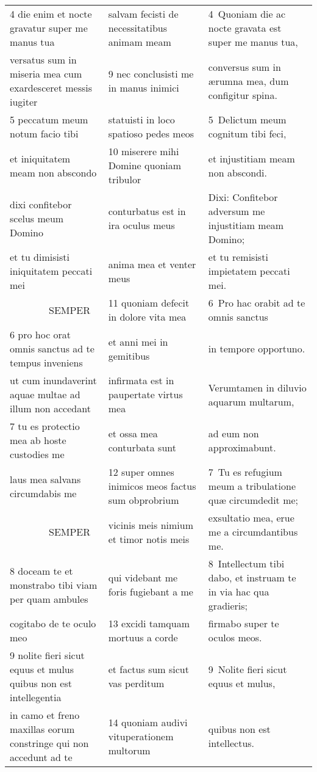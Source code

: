 \documentclass{article}
\begin{document}
\begin{longtable}{@{}p{}p{}p{}@{}}
4 die enim et nocte gravatur super me manus tua	&	salvam fecisti de necessitatibus animam meam	&	4 Quoniam die ac nocte gravata est super me manus tua,	\\
versatus sum in miseria mea cum exardesceret messis iugiter	&	9 nec conclusisti me in manus inimici	&	conversus sum in ærumna mea, dum configitur spina.	\\
5 peccatum meum notum facio tibi	&	statuisti in loco spatioso pedes meos	&	5 Delictum meum cognitum tibi feci,	\\
et iniquitatem meam non abscondo	&	10 miserere mihi Domine quoniam tribulor	&	et injustitiam meam non abscondi.	\\
dixi confitebor scelus meum Domino	&	conturbatus est in ira oculus meus	&	Dixi: Confitebor adversum me injustitiam meam Domino;	\\
et tu dimisisti iniquitatem peccati mei	&	anima mea et venter meus	&	et tu remisisti impietatem peccati mei.	\\
    SEMPER	&	11 quoniam defecit in dolore vita mea	&	6 Pro hac orabit ad te omnis sanctus	\\
6 pro hoc orat omnis sanctus ad te tempus inveniens	&	et anni mei in gemitibus	&	in tempore opportuno.	\\
ut cum inundaverint aquae multae ad illum non accedant	&	infirmata est in paupertate virtus mea	&	Verumtamen in diluvio aquarum multarum,	\\
7 tu es protectio mea ab hoste custodies me	&	et ossa mea conturbata sunt	&	ad eum non approximabunt.	\\
laus mea salvans circumdabis me	&	12 super omnes inimicos meos factus sum obprobrium	&	7 Tu es refugium meum a tribulatione quæ circumdedit me;	\\
    SEMPER	&	vicinis meis nimium et timor notis meis	&	exsultatio mea, erue me a circumdantibus me.	\\
8 doceam te et monstrabo tibi viam per quam ambules	&	qui videbant me foris fugiebant a me	&	8 Intellectum tibi dabo, et instruam te in via hac qua gradieris;	\\
cogitabo de te oculo meo	&	13 excidi tamquam mortuus a corde	&	firmabo super te oculos meos.	\\
9 nolite fieri sicut equus et mulus quibus non est intellegentia	&	et factus sum sicut vas perditum	&	9 Nolite fieri sicut equus et mulus,	\\
in camo et freno maxillas eorum constringe qui non accedunt ad te	&	14 quoniam audivi vituperationem multorum	&	quibus non est intellectus.	\\

\end{longtable}
\end{document}
